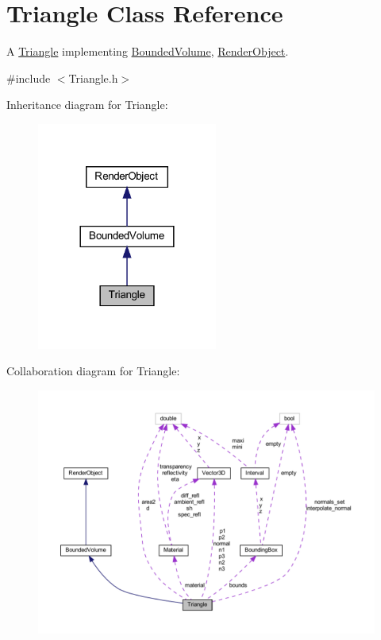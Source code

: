 \hypertarget{classTriangle}{}\section{Triangle Class Reference}
\label{classTriangle}


A \mbox{\hyperlink{classTriangle}{Triangle}} implementing \mbox{\hyperlink{classBoundedVolume}{Bounded\+Volume}}, \mbox{\hyperlink{classRenderObject}{Render\+Object}}.  




{\ttfamily \#include $<$Triangle.\+h$>$}



Inheritance diagram for Triangle\+:
\nopagebreak
\begin{figure}[H]
\begin{center}
\leavevmode
\includegraphics[width=168pt]{classTriangle__inherit__graph}
\end{center}
\end{figure}


Collaboration diagram for Triangle\+:
\nopagebreak
\begin{figure}[H]
\begin{center}
\leavevmode
\includegraphics[width=350pt]{classTriangle__coll__graph}
\end{center}
\end{figure}
